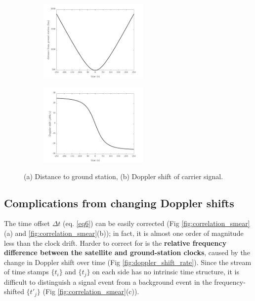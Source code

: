 \begin{figure}[ht!]
	\centering
	\begin{subfigure}[t]{0.49\linewidth}
		\centering
		\includegraphics[height=4cm]{assets/distance.png}
		\subcaption{}
	\end{subfigure}
	\begin{subfigure}[t]{0.49\textwidth}
		\centering
		\includegraphics[height=4cm]{assets/doppler_shift.png}
		\subcaption{}
	\end{subfigure}
\caption{(a) Distance to ground station, (b) Doppler shift of carrier signal.}
\label{fig:doppler_shift}
\end{figure}

\subsection{Complications from changing Doppler shifts} 
The time offset $\Delta t$ (eq. \ref{eq6}) can be easily corrected (Fig \ref{fig:correlation_smear}(a) and \ref{fig:correlation_smear}(b)); in fact, it is almost one order of magnitude less than the clock drift. Harder to correct for is the \textbf{relative frequency difference between the satellite and ground-station clocks}, caused by the change in Doppler shift over time (Fig \ref{fig:doppler_shift_rate}). Since the stream of time stamps $\{t_i\}$ and $\{t_j\}$ on each side has no intrinsic time structure, it is difficult to distinguish a signal event from a background event in the frequency-shifted $\{t'_j\}$ (Fig \ref{fig:correlation_smear}(c)).

